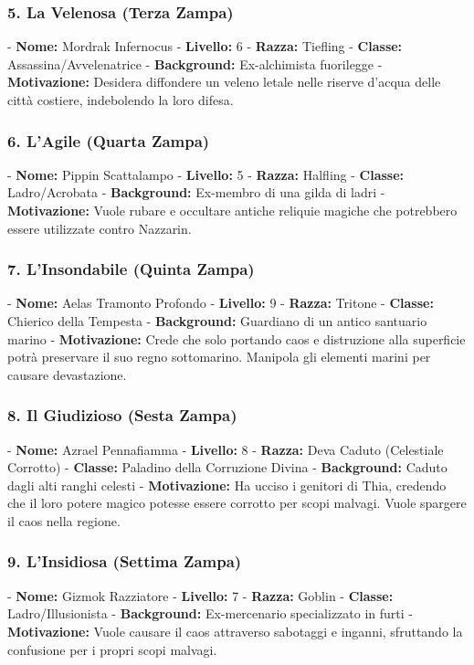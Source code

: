 \documentclass{article}
\begin{document}
\subsubsection*{5. La Velenosa (Terza Zampa)}
   - \textbf{Nome:} Mordrak Infernocus
   - \textbf{Livello:} 6
   - \textbf{Razza:} Tiefling
   - \textbf{Classe:} Assassina/Avvelenatrice
   - \textbf{Background:} Ex-alchimista fuorilegge
   - \textbf{Motivazione:} Desidera diffondere un veleno letale nelle riserve d'acqua delle città costiere, indebolendo la loro difesa.

\subsubsection*{6. L'Agile (Quarta Zampa)}
   - \textbf{Nome:} Pippin Scattalampo
   - \textbf{Livello:} 5
   - \textbf{Razza:} Halfling
   - \textbf{Classe:} Ladro/Acrobata
   - \textbf{Background:} Ex-membro di una gilda di ladri
   - \textbf{Motivazione:} Vuole rubare e occultare antiche reliquie magiche che potrebbero essere utilizzate contro Nazzarin.

\subsubsection*{7. L'Insondabile (Quinta Zampa)}
   - \textbf{Nome:} Aelas Tramonto Profondo
   - \textbf{Livello:} 9
   - \textbf{Razza:} Tritone
   - \textbf{Classe:} Chierico della Tempesta
   - \textbf{Background:} Guardiano di un antico santuario marino
   - \textbf{Motivazione:} Crede che solo portando caos e distruzione alla superficie potrà preservare il suo regno sottomarino. Manipola gli elementi marini per causare devastazione.

\subsubsection*{8. Il Giudizioso (Sesta Zampa)}
   - \textbf{Nome:} Azrael Pennafiamma
   - \textbf{Livello:} 8
   - \textbf{Razza:} Deva Caduto (Celestiale Corrotto)
   - \textbf{Classe:} Paladino della Corruzione Divina
   - \textbf{Background:} Caduto dagli alti ranghi celesti
   - \textbf{Motivazione:} Ha ucciso i genitori di Thia, credendo che il loro potere magico potesse essere corrotto per scopi malvagi. Vuole spargere il caos nella regione.

\subsubsection*{9. L'Insidiosa (Settima Zampa)}
   - \textbf{Nome:} Gizmok Razziatore
   - \textbf{Livello:} 7
   - \textbf{Razza:} Goblin
   - \textbf{Classe:} Ladro/Illusionista
   - \textbf{Background:} Ex-mercenario specializzato in furti
   - \textbf{Motivazione:} Vuole causare il caos attraverso sabotaggi e inganni, sfruttando la confusione per i propri scopi malvagi.
\end{document}
